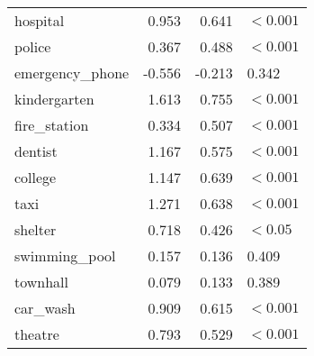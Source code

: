 \begin{tabular}{lrrl}
hospital           & 0.953  & 0.641  & $<0.001$ \\  
police             & 0.367  & 0.488  & $<0.001$ \\  
emergency\_phone   & -0.556 & -0.213 & 0.342    \\  
kindergarten       & 1.613  & 0.755  & $<0.001$ \\  
fire\_station      & 0.334  & 0.507  & $<0.001$ \\  
dentist            & 1.167  & 0.575  & $<0.001$ \\  
college            & 1.147  & 0.639  & $<0.001$ \\  
taxi               & 1.271  & 0.638  & $<0.001$ \\  
shelter            & 0.718  & 0.426  & $<0.05$  \\  
swimming\_pool     & 0.157  & 0.136  & 0.409    \\  
townhall           & 0.079  & 0.133  & 0.389    \\  
car\_wash          & 0.909  & 0.615  & $<0.001$ \\  
theatre            & 0.793  & 0.529  & $<0.001$ \\  
\bottomrule
\end{tabular}
